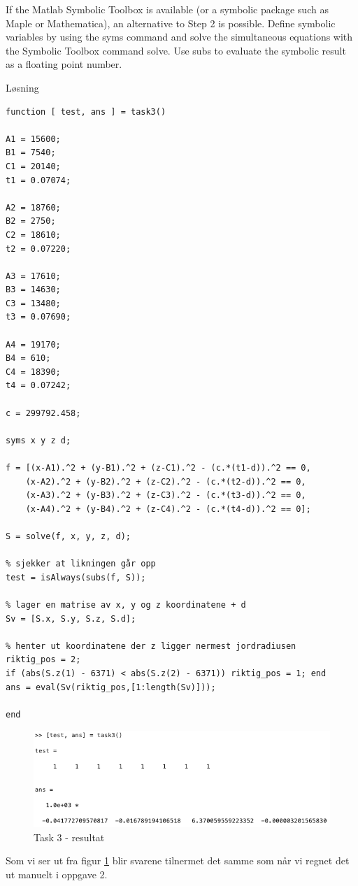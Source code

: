 % 

If the Matlab Symbolic Toolbox is available (or a symbolic package such as Maple
or Mathematica), an alternative to Step 2 is possible. Define symbolic variables by using the syms command and solve the simultaneous equations with the Symbolic Toolbox command solve. Use subs to evaluate the symbolic result as a floating point number.

\vspace{5mm}

Løsning


\begin{lstlisting}[caption={Task3.m}]
function [ test, ans ] = task3()

A1 = 15600;
B1 = 7540;
C1 = 20140;
t1 = 0.07074;

A2 = 18760;
B2 = 2750;
C2 = 18610;
t2 = 0.07220;

A3 = 17610;
B3 = 14630;
C3 = 13480;
t3 = 0.07690;

A4 = 19170;
B4 = 610;
C4 = 18390;
t4 = 0.07242;

c = 299792.458;

syms x y z d;

f = [(x-A1).^2 + (y-B1).^2 + (z-C1).^2 - (c.*(t1-d)).^2 == 0,
    (x-A2).^2 + (y-B2).^2 + (z-C2).^2 - (c.*(t2-d)).^2 == 0, 
    (x-A3).^2 + (y-B3).^2 + (z-C3).^2 - (c.*(t3-d)).^2 == 0, 
    (x-A4).^2 + (y-B4).^2 + (z-C4).^2 - (c.*(t4-d)).^2 == 0];

S = solve(f, x, y, z, d);

% sjekker at likningen går opp
test = isAlways(subs(f, S));

% lager en matrise av x, y og z koordinatene + d
Sv = [S.x, S.y, S.z, S.d];

% henter ut koordinatene der z ligger nermest jordradiusen
riktig_pos = 2;
if (abs(S.z(1) - 6371) < abs(S.z(2) - 6371)) riktig_pos = 1; end
ans = eval(Sv(riktig_pos,[1:length(Sv)]));

end
\end{lstlisting}

\begin{figure}[h]
    \centering
    \includegraphics[width=1\textwidth]{sections/Exercise3/task3result}
    \caption{Task 3 - resultat}
    \label{fig:task3result}
\end{figure}

Som vi ser ut fra figur \ref{fig:task3result} blir svarene tilnermet det samme som når vi regnet det ut manuelt i oppgave 2.

% 